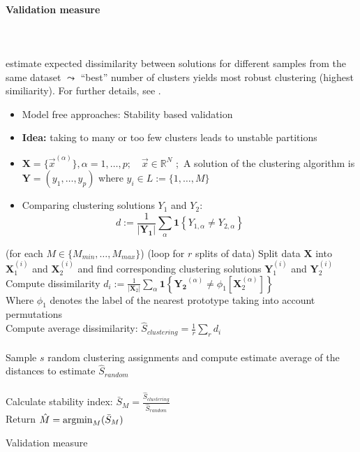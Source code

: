 \paragraph{Validation measure}\mbox{}\\\\
\textcite{LangeEtAl2004} estimate expected dissimilarity between
solutions for different samples from the same dataset $\leadsto$
``best'' number of clusters yields most robust clustering (highest
similiarity). For further details, see \textcite{Luxburg2010}. 
\begin{itemize}
\item Model free approaches:  Stability based validation
\item \textbf{Idea:} taking to many or too few clusters leads to unstable partitions
\item $\mathbf{X} = \big\{ \vec{x}^{(\alpha)} \big\}, \alpha = 1, \ldots, p; \quad \vec{x} \in \mathbb{R}^N$ ;\
A solution of the clustering algorithm is $\mathbf{Y} =(y_{1}, \ldots , y_{p})$ where $y_{i} \in L:=\{1,\ldots,M\}$
\item Comparing clustering solutions $Y_{1}$ and $Y_{2}$:\\
$$d:= \frac{1}{|\mathbf{Y_1}|}
      \sum_\alpha \mathbf{1}\left\{Y_{1, \alpha}\neq Y_{2, \alpha} \right\}\qquad$$ 
\end{itemize}
\begin{algorithm}
\DontPrintSemicolon
\Begin (for each $M \in \{M_{min},\ldots,M_{max} \}$){
\Begin(loop for $r$ splits of data){
Split data $\mathbf{X}$ into $\mathbf{X}_1^{(i)}$ and $\mathbf{X}_2^{(i)}$ and find corresponding clustering solutions $\mathbf{Y}_{1}^{(i)}$ and $\mathbf{Y}_{2}^{(i)}$  \\
Compute dissimilarity $d_i:= \frac{1}{|\mathbf{X}_2|}
      \sum_\alpha \mathbf{1}\left\{\mathbf{Y_2}^{(\alpha)}\neq \phi_1[\mathbf{X}_2^{(\alpha)}]\right\}\qquad $\\
      Where $\phi_1$ denotes the label of the nearest prototype taking into account permutations\\
       
}
Compute average dissimilarity: $\hat{S}_{clustering}= \frac{1}{r}\sum_r d_i$ \\~\\
Sample $s$ random clustering assignments and compute estimate average of the distances to estimate  $\hat{S}_{random}$ \\~\\
Calculate stability index:  $\bar{S}_M = \frac{\hat{S}_{clustering}}{\hat{S}_{random}}$ \\
}
Return $\hat{M} = \argmin_M(\bar{S}_M)$

\caption{Validation measure}
\end{algorithm}
